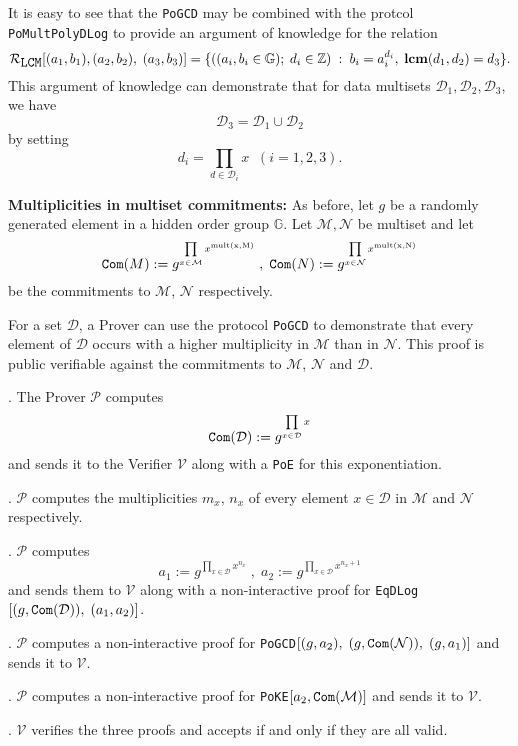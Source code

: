 \documentclass[11pt, lettersize, notitlepage, leqno, footskip=0.6cm]{article}
\newcommand{\bz}{\mathbb Z}
\newcommand{\pl}{\prod\limits}
\newcommand{\mc}{\mathcal}
\newcommand{\mb}{\mathbb}
\newcommand{\mbf}{\mathbf}
\newcommand{\mr}{\mathrm}
\newcommand{\mP}{\mc{P}}
\newcommand{\V}{\mc{V}}
\newcommand{\vs}{\vspace{-0.15cm}}
\newcommand{\noin}{\noindent}
\newcommand{\LCM}{\mbf{lcm}}
\numberwithin{equation}{section}
\begin{document}
It is easy to see that the \verb|PoGCD| may be combined with the protcol \verb|PoMultPolyDLog| to provide an argument of knowledge for the relation \vs $$\mc{R}_{{\protect\verb|LCM|}}[(a_1,b_1),(a_2,b_2), \; (a_3, b_3)] = \{((a_i, b_i\in\mb{G});\;d_i\in\bz)\;:\; b_i = a_i^{d_i},\;\LCM(d_1,d_2)=d_3 \} .$$ This argument of knowledge can demonstrate that for data multisets $\mc{D}_1,\mc{D}_2, \mc{D}_3$, we have \vs $$\mc{D}_3 = \mc{D}_1\cup \mc{D}_2 $$ by setting \vs $$ d_i = \prod\limits_{d\in\mc{D}_i} x\;\;(i=1,2,3).$$\vspace{0.2cm}


\noin \textbf{Multiplicities in multiset commitments:} As before, let $g$ be a randomly generated element in a hidden order group $\mb{G}$. Let $\mc{M}, \mc{N}$ be multiset and let \vs $$\protect{\verb|Com|}(M):= g^{\pl_{x\in \mc{M}} x^{\mr{mult(x,M)}}}\;,\;\protect{\verb|Com|}(N):= g^{\pl_{x\in \mc{N}} x^{\mr{mult(x,N)}}}$$ be the commitments to $\mc{M}$, $\mc{N}$ respectively.

For a set $\mc{D}$, a Prover can use the protocol \verb|PoGCD| to demonstrate that every element of $\mc{D}$ occurs with a higher multiplicity in $\mc{M}$ than in $\mc{N}$. This proof is public verifiable against the commitments to $\mc{M}$, $\mc{N}$ and $\mc{D}$. \vspace{0.15cm}

\noin 1. The Prover $\mP$ computes \vs $$\protect{\verb|Com|}(\mc{D}):= g^{\pl_{x\in \mc{D}} x}$$ and sends it to the Verifier $\V$ along with a \verb|PoE| for this exponentiation.

\noin 2. $\mP$ computes the multiplicities $m_x$, $n_x$ of every element $x\in\mc{D}$ in $\mc{M}$ and $\mc{N}$ respectively.

\noin 3. $\mP$ computes \vs $$a_1:= g^{{\pl_{x\in \mc{D}} x^{n_x}}}\;,\; a_2 := g^{{\pl_{x\in \mc{D}} x^{n_x+1}}} $$ and sends them to $\V$ along with a non-interactive proof for \verb|EqDLog|$[(g, \protect{\verb|Com|}(\mc{D})),\;(a_1,a_2)]$.

\noin 4. $\mP$ computes a non-interactive proof for \verb|PoGCD|$[(g, a_2),\;(g, \protect{\verb|Com|}(\mc{N})),\;(g,a_1)]$ and sends it to $\V$. 

\noin 5. $\mP$ computes a non-interactive proof for \verb|PoKE|$[a_2, \protect{\verb|Com|}(\mc{M})]$ and sends it to $\V$.

\noin 6. $\V$ verifies the three proofs and accepts if and only if they are all valid.
 
\end{document}
